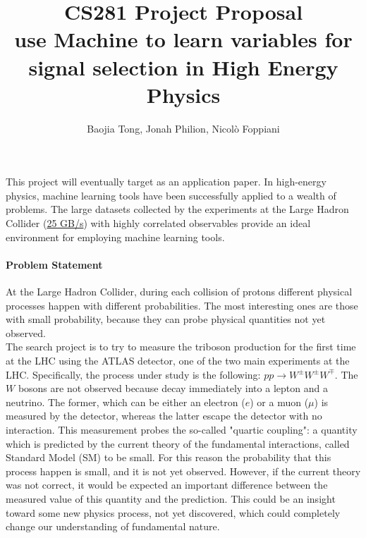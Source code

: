 \documentclass[11pt]{article}
\title{CS281 Project Proposal \\
	\large use Machine to learn variables for signal selection in High Energy Physics}
\author{Baojia Tong, Jonah Philion, Nicolò Foppiani}
\date{}                                           %
\begin{document}
\maketitle

\paragraph{}
This project will eventually target as an application paper. In high-energy physics, machine learning tools have been successfully applied to a wealth of problems. The large datasets collected by the experiments at the Large Hadron Collider (\href{https://home.cern/about/computing/processing-what-record}{25 GB/s}) with highly correlated observables provide an ideal environment for employing machine learning tools.

\paragraph{Problem Statement}
At the Large Hadron Collider, during each collision of protons different physical processes happen with different probabilities. The most interesting ones are those with small probability, because they can probe physical quantities not yet observed.\\
The search project is to try to measure the triboson production for the first time at the LHC using the ATLAS detector, one of the two main experiments at the LHC. Specifically, the process under study is the following: $pp \rightarrow W^{\pm}W^{\pm}W^{\mp}$. The $W$ bosons are not observed because decay immediately into a lepton and a neutrino. The former, which can be either an electron ($e$) or a muon ($\mu$) is measured by the detector, whereas the latter escape the detector with no interaction. This measurement probes the so-called "quartic coupling": a quantity which is predicted by the current theory of the fundamental interactions, called Standard Model (SM) to be small. For this reason the probability that this process happen is small, and it is not yet observed. However, if the current theory was not correct, it would be expected an important difference between the measured value of this quantity and the prediction. This could be an insight toward some new physics process, not yet discovered, which could completely change our understanding of fundamental nature. 
\end{document}
